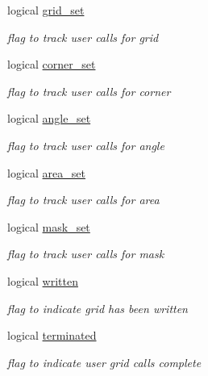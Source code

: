 \begin{DoxyCompactItemize}
logical \hyperlink{structmod__oasis__grid_1_1prism__grid__type_a41b62a294b04765a04f6f0d70c261df7}{grid\+\_\+set}
\begin{DoxyCompactList}\small\item\em flag to track user calls for grid \end{DoxyCompactList}\item 
logical \hyperlink{structmod__oasis__grid_1_1prism__grid__type_a852b381de47913b96e3fa28ade472579}{corner\+\_\+set}
\begin{DoxyCompactList}\small\item\em flag to track user calls for corner \end{DoxyCompactList}\item 
logical \hyperlink{structmod__oasis__grid_1_1prism__grid__type_a4a357fd1eb4b19d1beea5968dd783882}{angle\+\_\+set}
\begin{DoxyCompactList}\small\item\em flag to track user calls for angle \end{DoxyCompactList}\item 
logical \hyperlink{structmod__oasis__grid_1_1prism__grid__type_a369c091ef9af0281c5b4f92390f4265f}{area\+\_\+set}
\begin{DoxyCompactList}\small\item\em flag to track user calls for area \end{DoxyCompactList}\item 
logical \hyperlink{structmod__oasis__grid_1_1prism__grid__type_ae44525ecb0b2dfe8d4a4a8cf4abd4e1f}{mask\+\_\+set}
\begin{DoxyCompactList}\small\item\em flag to track user calls for mask \end{DoxyCompactList}\item 
logical \hyperlink{structmod__oasis__grid_1_1prism__grid__type_a48d243ede1b306ac35bb9bbeff48785a}{written}
\begin{DoxyCompactList}\small\item\em flag to indicate grid has been written \end{DoxyCompactList}\item 
logical \hyperlink{structmod__oasis__grid_1_1prism__grid__type_a2dcbbc51a20f881a1d06609688d72734}{terminated}
\begin{DoxyCompactList}\small\item\em flag to indicate user grid calls complete \end{DoxyCompactList}\item 

\end{DoxyCompactItemize}
